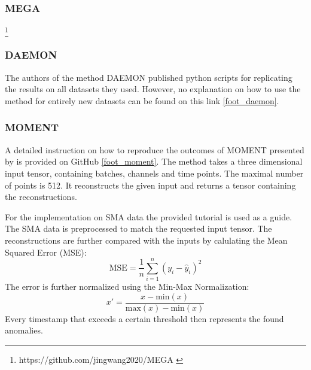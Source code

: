 \subsubsection{MEGA}
\footnote{\fussy\tiny https://github.com/jingwang2020/MEGA \label{test}}

\subsubsection{DAEMON}
The authors of the method DAEMON published python scripts for replicating the results on all datasets they used. However, no explanation on how to use the method for entirely new datasets can be found on this link \ref{foot_daemon}.

\subsubsection{MOMENT}
A detailed instruction on how to reproduce the outcomes of MOMENT presented by \cite{goswami_moment_2024} is provided on GitHub \ref{foot_moment}. The method takes a three dimensional input tensor, containing batches, channels and time points. The maximal number of points is 512. It reconstructs the given input and returns a tensor containing the reconstructions.

For the implementation on SMA data the provided tutorial is used as a guide. The SMA data is preprocessed to match the requested input tensor. The reconstructions are further compared with the inputs by calulating the Mean Squared Error (MSE):
\begin{equation}
    \text{MSE} = \frac{1}{n} \sum_{i=1}^{n} \left( y_i - \hat{y}_i \right)^2
\end{equation}
The error is further normalized using the Min-Max Normalization:
\begin{equation}
x' = \frac{x - \text{min}(x)}{\text{max}(x) - \text{min}(x)}
\end{equation}
Every timestamp that exceeds a certain threshold then represents the found anomalies.

